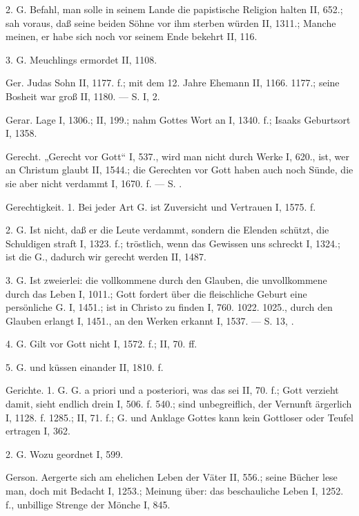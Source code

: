 2.  G. Befahl, man solle in seinem Lande die papistische Religion halten II, 652.; sah voraus, daß seine beiden Söhne vor ihm sterben würden II, 1311.; Manche meinen, er habe sich noch vor seinem Ende bekehrt II, 116.

3.  G. Meuchlings ermordet II, 1108.

Ger. Judas Sohn II, 1177. f.; mit dem 12. Jahre Ehemann II, 1166. 1177.; seine Bosheit war groß II, 1180. — S.  I, 2.

Gerar. Lage I, 1306.; II, 199.; nahm Gottes Wort an I, 1340. f.; Isaaks Geburtsort I, 1358.

Gerecht. „Gerecht vor Gott“ I, 537., wird man nicht durch Werke I, 620., ist, wer an Christum glaubt II, 1544.; die Gerechten vor Gott haben auch noch Sünde, die sie aber nicht verdammt I, 1670. f. — S. .

Gerechtigkeit. 1.  Bei jeder Art G. ist Zuversicht und Vertrauen I, 1575. f.

2. G.  Ist nicht, daß er die Leute verdammt, sondern die Elenden schützt, die Schuldigen straft I, 1323. f.; tröstlich, wenn das Gewissen uns schreckt I, 1324.; ist die G., dadurch wir gerecht werden II, 1487.

3. G.  Ist zweierlei: die vollkommene durch den Glauben, die unvollkommene durch das Leben I, 1011.; Gott fordert über die fleischliche Geburt eine persönliche G. I, 1451.; ist in Christo zu finden I, 760. 1022. 1025., durch den Glauben erlangt I, 1451., an den Werken erkannt I, 1537. — S.  13, .

4. G.  Gilt vor Gott nicht I, 1572. f.; II, 70. ff.

5. G. und  küssen einander II, 1810. f.

Gerichte. 1. G.  G. a priori und a posteriori, was das sei II, 70. f.; Gott verzieht damit, sieht endlich drein I, 506. f. 540.; sind unbegreiflich, der Vernunft ärgerlich I, 1128. f. 1285.; II, 71. f.; G. und Anklage Gottes kann kein Gottloser oder Teufel ertragen I, 362.

2.  G. Wozu geordnet I, 599.

Gerson. Aergerte sich am ehelichen Leben der Väter II, 556.; seine Bücher lese man, doch mit Bedacht I, 1253.; Meinung über: das beschauliche Leben I, 1252. f., unbillige Strenge der Mönche I, 845.

